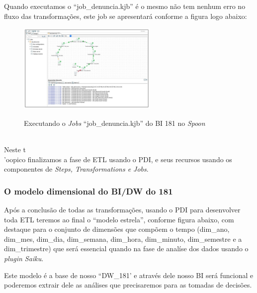 Quando executamos o ``job\_denuncia.kjb'' \'{e} o mesmo n\~{a}o tem nenhum erro no fluxo das transforma\c{c}\~{o}es, 
este job se apresentar\'{a} conforme a figura logo abaixo:

\begin{figure}[H]
	\vspace*{0,2cm}
    \centering
    \caption{Executando o \textit{Jobs} ``job\_denuncia.kjb'' do BI 181 no \textit{Spoon}}
    \includegraphics[width=0.6\textwidth]{./04-figuras/figura-exec-job-denuncia}
    \label{fig:ilustfigexecjobdenuncia}
\end{figure}
\vspace*{-0,9cm}
{\raggedright {}} \\

Neste t\\'{o}{o}pico finalizamos a fase de ETL usando o PDI, e seus recursos usando os componentes de \textit{Steps, Transformations e Jobs}.

\subsubsection{O modelo dimensional do BI/DW do 181}

Ap\'os a conclus\~{a}o de todas as transforma\c{c}\~{o}es, usando o PDI para desenvolver toda ETL teremos ao final o ``modelo estrela'', 
conforme figura abaixo, com destaque para o conjunto de dimens\~{o}es que comp\~{o}em o tempo (dim\_ano, dim\_mes, dim\_dia, dim\_semana, 
dim\_hora, dim\_minuto, dim\_semestre e a dim\_trimestre) que ser\'{a} essencial quando na fase de anal\'{i}se dos dados usando o \textit{plugin Saiku}. 

Este modelo \'{e} a base de nosso ``DW\_181' e atrav\'{e}s dele nosso BI ser\'{a} 
funcional e poderemos extrair dele as an\'{a}lises que precisaremos para as tomadas de decis\~{o}es.

